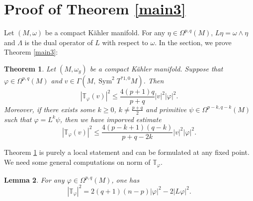 \documentclass[12pt, reqno]{amsart}
\DeclareMathOperator*{\Sym}{Sym}
\theoremstyle{plain}
\newtheorem{thm}{Theorem}[section]
\newtheorem{lemma}[thm]{Lemma}
\theoremstyle{definition}
\newcommand{\btheorem}{\begin{thm}}
\newcommand{\etheorem}{\end{thm}}
\newcommand{\elemma}{\end{lemma}}
\newcommand{\blemma}{\begin{lemma}}
\renewcommand{\phi}{\varphi}
\newcommand{\beq}{\begin{equation}}
\newcommand{\eeq}{\end{equation}}
\newcommand{\Om}{\Omega}
\renewcommand{\>}{\rightarrow}
\renewcommand{\#}{\sharp}
\numberwithin{equation}{section} %
\begin{document}
\baselineskip





\section{Proof of Theorem \ref{main3}}
Let $(M,\omega)$ be a compact K\"ahler manifold. For any $\eta\in \Om^{p,q}(M)$, $L\eta=\omega\wedge \eta$ and $\Lambda$ is the dual operator of $L$ with respect to $\omega$. In the section, we prove Theorem \ref{main3}:

\btheorem
\label{normTestimate}
 Let  $(M,\omega_g)$ be a compact K\"ahler manifold. Suppose that $ \phi \in \Omega^{p,q}(M) $ and $ v \in \Gamma\left(M,\Sym^2 T^{*1,0}M\right) $. Then 
\beq |\mathbb T_\phi(v)|^2 \leq \frac{4(p+1)q}{p+q} |v|^2 |\phi|^2.\eeq 
Moreover, if  there exists some $k\geq 0$, $k\neq \frac{p+q}{2}$ and primitive $\psi\in \Omega^{p-k,q-k}(M) $ such that  $\phi=L^k\psi $,
then we have imporved estimate
\beq |\mathbb T_\phi(v)|^2 \leq \frac{4(p-k+1)(q-k)}{p+q-2k} |v|^2 |\phi|^2. \label{keyinequality2}\eeq
\etheorem

\noindent Theorem \ref{normTestimate} is purely a local statement and can be formulated at any fixed point. We need some general computations on norm of $\mathbb T_\phi$.






\blemma
For any $ \phi \in \Omega^{p,q}(M) $, one has
\beq \label{normT1}|\mathbb T_\phi|^2 = 2(q+1)(n-p)|\phi|^2 - 2|L\phi|^2. \eeq
\elemma
\end{document}
